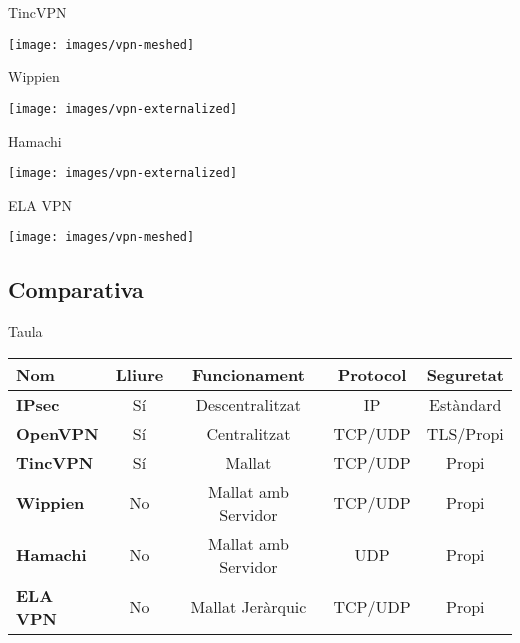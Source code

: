     \begin{frame}{TincVPN}
        \begin{center}
        \texttt{[image: images/vpn-meshed]}
        \end{center}
    \end{frame}
    \begin{frame}{Wippien}
        \begin{center}
        \texttt{[image: images/vpn-externalized]}
        \end{center}
    \end{frame}
    \begin{frame}{Hamachi}
        \begin{center}
        \texttt{[image: images/vpn-externalized]}
        \end{center}
    \end{frame}
    \begin{frame}{ELA VPN}
        \begin{center}
        \texttt{[image: images/vpn-meshed]}
        \end{center}
    \end{frame}

\subsection{Comparativa}
    \begin{frame}{Taula}
        \begin{center}
\begin{tabular}{|l|c|c|c|c|}
\hline
Nom & Lliure & Funcionament & Protocol & Seguretat \\ \hline \hline
\bf IPsec & Sí & Descentralitzat & IP & Estàndard \\ \hline
\bf OpenVPN & Sí & Centralitzat & TCP/UDP & TLS/Propi \\ \hline
\bf TincVPN & Sí & Mallat & TCP/UDP & Propi \\ \hline
\bf Wippien & No & Mallat amb Servidor & TCP/UDP & Propi \\ \hline
\bf Hamachi & No & Mallat amb Servidor & UDP & Propi \\ \hline
\bf ELA VPN & No & Mallat Jeràrquic & TCP/UDP & Propi \\ \hline
\end{tabular}
        \end{center}
    \end{frame}
